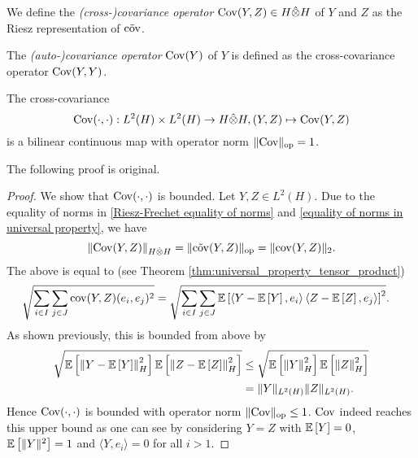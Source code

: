 \begin{defn} \label{defn:covariance operator}
    We define the \textit{(cross-)co\-variance operator} $\mathrm{Cov}(Y, Z) \in H \hat{\otimes} H$ of $Y$ and $Z$ as the Riesz representation of $\Tilde{\mathrm{cov}}$.

    The \textit{(auto-)covariance operator} $\mathrm{Cov}(Y)$ of $Y$ is defined as the cross-covariance operator $\mathrm{Cov}(Y, Y)$.
\end{defn}

\begin{proposition} \label{covariance is continuous}
    The cross-covariance
    \[ \mathrm{Cov}(\cdot, \cdot): L^2(H) \times L^2(H) \to H \hat{\otimes} H, (Y, Z) \mapsto \mathrm{Cov}(Y, Z) \]
    is a bilinear continuous map with operator norm $\| \mathrm{Cov} \|_{\mathrm{op}} = 1$.
\end{proposition}
The following proof is original.
\begin{proof}
    We show that $\mathrm{Cov}(\cdot, \cdot)$ is bounded. Let $Y, Z \in L^2(H)$. Due to the equality of norms in \eqref{Riesz-Frechet equality of norms} and \eqref{equality of norms in universal property}, we have
    \[ \| \mathrm{Cov}(Y, Z) \|_{H \hat{\otimes} H} = \| \Tilde{\mathrm{cov}}(Y, Z) \|_{\mathrm{op}} = \| \mathrm{cov}(Y, Z) \|_2. \]
    The above is equal to (see Theorem \ref{thm:universal_property_tensor_product})
    \begin{align*}
        \sqrt{\sum\limits_{i \in I} \sum\limits_{j \in J} \mathrm{cov}(Y, Z)(e_i, e_j)^2 }
        & = \sqrt{\sum\limits_{i \in I} \sum\limits_{j \in J} \mathbb{E}\left[\left\langle Y - \mathbb{E}\left[Y\right], e_i \right\rangle  \left\langle Z - \mathbb{E}\left[Z\right], e_j \right\rangle \right]^2 }.
    \end{align*}
    As shown previously, this is bounded from above by
    \begin{align*}
        \sqrt{ \mathbb{E}\left[\left\|Y - \mathbb{E}\left[Y\right] \right\|_H^2\right] \mathbb{E}\left[\left\| Z - \mathbb{E}\left[Z\right] \right\|_H^2\right] } 
        & \leq \sqrt{ \mathbb{E}\left[\left\|Y \right\|_H^2\right] \mathbb{E}\left[\left\| Z \right\|_H^2\right] } \\
        & = \| Y \|_{L^2(H)}  \| Z \|_{L^2(H)}.
    \end{align*}
    Hence $\mathrm{Cov}(\cdot, \cdot)$ is bounded with operator norm $\| \mathrm{Cov} \|_{\mathrm{op}} \leq 1$. $\mathrm{Cov}$ indeed reaches this upper bound as one can see by considering $Y = Z$ with $\mathbb{E}\left[Y\right] = 0$, $\mathbb{E}\left[\| Y \|^2\right] = 1$ and $\langle Y, e_i \rangle = 0$ for all $i > 1$.
\end{proof}


